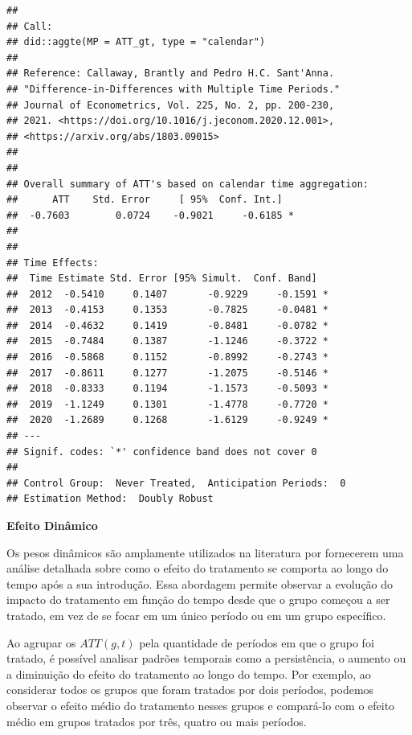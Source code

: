 \documentclass[portugues]{article}
\begin{document}
\begin{box_code}
\begin{verbatim}
## 
## Call:
## did::aggte(MP = ATT_gt, type = "calendar")
## 
## Reference: Callaway, Brantly and Pedro H.C. Sant'Anna.  
## "Difference-in-Differences with Multiple Time Periods." 
## Journal of Econometrics, Vol. 225, No. 2, pp. 200-230, 
## 2021. <https://doi.org/10.1016/j.jeconom.2020.12.001>, 
## <https://arxiv.org/abs/1803.09015> 
## 
## 
## Overall summary of ATT's based on calendar time aggregation:  
##      ATT    Std. Error     [ 95%  Conf. Int.]  
##  -0.7603        0.0724    -0.9021     -0.6185 *
## 
## 
## Time Effects:
##  Time Estimate Std. Error [95% Simult.  Conf. Band]  
##  2012  -0.5410     0.1407       -0.9229     -0.1591 *
##  2013  -0.4153     0.1353       -0.7825     -0.0481 *
##  2014  -0.4632     0.1419       -0.8481     -0.0782 *
##  2015  -0.7484     0.1387       -1.1246     -0.3722 *
##  2016  -0.5868     0.1152       -0.8992     -0.2743 *
##  2017  -0.8611     0.1277       -1.2075     -0.5146 *
##  2018  -0.8333     0.1194       -1.1573     -0.5093 *
##  2019  -1.1249     0.1301       -1.4778     -0.7720 *
##  2020  -1.2689     0.1268       -1.6129     -0.9249 *
## ---
## Signif. codes: `*' confidence band does not cover 0
## 
## Control Group:  Never Treated,  Anticipation Periods:  0
## Estimation Method:  Doubly Robust
\end{verbatim}

\end{box_code}



\vspace{3mm}

\textbf{Efeito Dinâmico}

\vspace{2mm}

Os pesos dinâmicos são amplamente utilizados na literatura por fornecerem uma análise detalhada sobre como o efeito do tratamento se comporta ao longo do tempo após a sua introdução. Essa abordagem permite observar a evolução do impacto do tratamento em função do tempo desde que o grupo começou a ser tratado, em vez de se focar em um único período ou em um grupo específico.

Ao agrupar os $ATT(g,t)$ pela quantidade de períodos em que o grupo foi tratado, é possível analisar padrões temporais como a persistência, o aumento ou a diminuição do efeito do tratamento ao longo do tempo. Por exemplo, ao considerar todos os grupos que foram tratados por dois períodos, podemos observar o efeito médio do tratamento nesses grupos e compará-lo com o efeito médio em grupos tratados por três, quatro ou mais períodos.  
\end{document}
